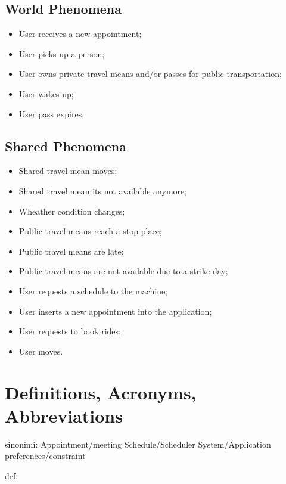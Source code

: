\subsection{World Phenomena}
\begin{itemize}
\item User receives a new appointment;
\item User picks up a person;
\item User owns private travel means and/or passes for public transportation;
\item User wakes up;
\item User pass expires.
\end{itemize}

\subsection{Shared Phenomena}
\begin{itemize}
\item Shared travel mean moves;
\item Shared travel mean its not available anymore;
\item Wheather condition changes;
\item Public travel means reach a stop-place;
\item Public travel means are late; 
\item Public travel means are not available due to a strike day;
\item User requests a schedule to the machine;
\item User inserts a new appointment into the application;
\item User requests to book rides;
\item User moves.
\end{itemize}

\section{Definitions, Acronyms, Abbreviations}

\newtheorem{mydef}{Definition}

sinonimi:
Appointment/meeting
Schedule/Scheduler
System/Application
preferences/constraint

%

def:


